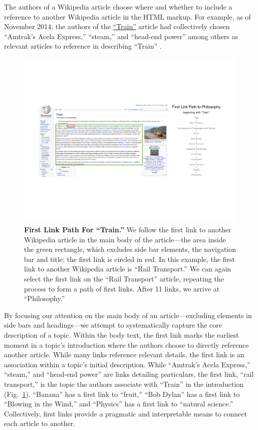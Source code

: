 \documentclass[pre,twocolumn,twoside,superscriptaddress,floatfix, aps, 10pt]{revtex4-1}
\begin{document}
The authors of a Wikipedia article choose where and whether to include a 
reference to another Wikipedia article
in the HTML markup.
For example, as of November 2014, the authors of the 
\href{https://en.wikipedia.org/wiki/Train}{``Train''}
article
had collectively chosen
``Amtrak's Acela Express,'' ``steam,'' and ``head-end power'' 
among others as relevant articles to reference in describing ``Train''
\cite{wiki_train}
.

\begin{figure}[tp!]
  \includegraphics[width=\textwidth]{graphics/Train.pdf}  
  \caption{
    \textbf{First Link Path For ``Train.''}
    We follow the first link  to another Wikipedia article
    in the main body of the article---the area
    inside the green rectangle, which excludes 
    side bar elements, the navigation bar and title; the first link is circled in red. 
    In this example, the first link to another Wikipedia article is ``Rail Transport.'' 
    We can again select the first link on the ``Rail Transport''
    article, repeating the process to 
    form a path of first links. After 11 links, we arrive at ``Philosophy.''
  }
  \label{fig:Train First Links}
\end{figure}

By focusing our attention on the main body of an article---excluding
elements in side bars and headings---we 
attempt to systematically capture the core description of a topic.
Within the body text, the first link marks the earliest moment in a topic's introduction where the 
authors choose to directly reference another article. 
While many links reference relevant details, 
the first link is an association within a topic's initial 
description. While 
``Amtrak's Acela Express,'' ``steam,'' and ``head-end power'' 
are links detailing particulars, the first link, ``rail transport,''
is the topic the authors associate with ``Train'' in the introduction
(Fig.~\ref{fig:Train First Links}).
``Banana'' has a first link to ``fruit,'' ``Bob Dylan'' has a first link to 
``Blowing in the Wind,'' and ``Physics'' has a first link to ``natural science.''
Collectively, first links provide a pragmatic and interpretable 
means to connect each article to another.
\end{document}
